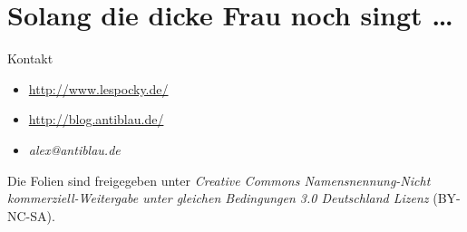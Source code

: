 \documentclass{beamer}
\begin{document}
\section*{Solang die dicke Frau noch singt \dots}

\begin{frame}{Kontakt}
    \begin{itemize}
        \item \url{http://www.lespocky.de/}
        \item \url{http://blog.antiblau.de/}
        \item \emph{alex@antiblau.de}
    \end{itemize}

    \vspace{1em}
    \small
    Die Folien sind freigegeben unter \emph{Creative Commons
    Namensnennung-Nicht kommerziell-Weitergabe unter gleichen
    Bedingungen 3.0 Deutschland Lizenz} (BY-NC-SA).
    \normalsize
\end{frame}
\end{document}
